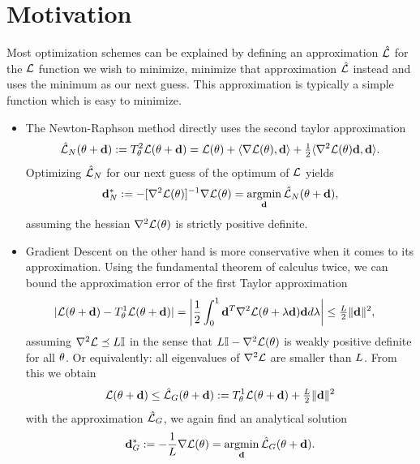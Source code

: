 \section{Motivation}

Most optimization schemes can be explained by defining an approximation 
\(\hat{\mathcal{L}}\) for the \(\mathcal{L}\) function we wish to minimize, minimize that
approximation \(\hat{\mathcal{L}}\) instead and uses the minimum as our next guess.
This approximation is typically a simple function which is easy to minimize.

\begin{itemize}
	\item 
	The Newton-Raphson method directly uses the second taylor approximation
	\begin{align*}
		\hat{\mathcal{L}}_{N}(\theta + \mathbf{d})
		:= T^2_\theta \mathcal{L}(\theta + \mathbf{d})
		= \mathcal{L}(\theta)
		+ \langle \nabla\mathcal{L}(\theta), \mathbf{d}\rangle
		+ \tfrac12 \langle \nabla^2\mathcal{L}(\theta) \mathbf{d}, \mathbf{d}\rangle.
	\end{align*}
	Optimizing \(\hat{\mathcal{L}}_{N}\) for our next guess of the optimum of \(\mathcal{L}\)
	yields
	\begin{align*}
		\mathbf{d}^*_{N} := -[\nabla^2\mathcal{L}(\theta)]^{-1}\nabla\mathcal{L}(\theta)
		= \operatorname*{argmin}_{\mathbf{d}} \hat{\mathcal{L}}_{N}(\theta + \mathbf{d}),
	\end{align*}
	assuming the hessian \(\nabla^2\mathcal{L}(\theta)\) is strictly positive definite.

	\item
	Gradient Descent on the other hand is more conservative when it comes to its
	approximation. Using the fundamental theorem of calculus twice, we can bound
	the approximation error of the first Taylor approximation
	\begin{align*}
		|\mathcal{L}(\theta+\mathbf{d}) - T^1_\theta \mathcal{L}(\theta+\mathbf{d})|
		&= \left| \frac 12 \int_0^1 \mathbf{d}^T \nabla^2\mathcal{L}(\theta + \lambda \mathbf{d})\mathbf{d} d\lambda\right|
		\le \tfrac{L}2 \|\mathbf{d}\|^2,
	\end{align*}
	assuming \(\nabla^2\mathcal{L} \preceq L\mathbb{I}\) in the sense that \(L\mathbb{I}
	- \nabla^2\mathcal{L}(\theta)\) is weakly positive definite for all \(\theta\). Or
	equivalently: all eigenvalues of \(\nabla^2\mathcal{L}\) are smaller than
	\(L\). From this we obtain
	\begin{align*}
		\mathcal{L}(\theta + \mathbf{d}) \le \hat{\mathcal{L}}_G(\theta+\mathbf{d})
		:= T^1_\theta \mathcal{L}(\theta+\mathbf{d}) + \tfrac{L}2\|\mathbf{d}\|^2
	\end{align*}
	with the approximation \(\hat{\mathcal{L}}_{G}\), we again find an analytical
	solution
	\begin{align*}
		\mathbf{d}^*_{G} := - \frac1{L} \nabla\mathcal{L}(\theta)
		= \operatorname*{argmin}_{\mathbf{d}} \hat{\mathcal{L}}_{G}(\theta + \mathbf{d}).
	\end{align*}
\end{itemize}

